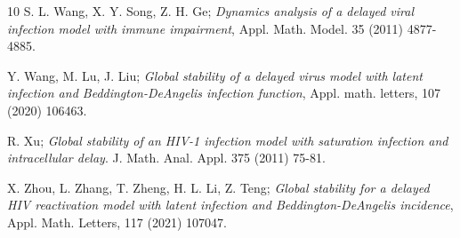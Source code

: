 \documentclass[reqno]{amsart}
\begin{document}
\begin{thebibliography}{10}
 S. L. Wang, X. Y. Song, Z. H. Ge;
\emph{Dynamics analysis of a delayed viral infection model with immune impairment}, 
Appl. Math. Model. 35 (2011) 4877-4885.

 Y. Wang, M. Lu, J. Liu;
\emph{Global stability of a delayed virus model with latent infection and 
Beddington-DeAngelis infection function}, 
Appl. math. letters, 107 (2020) 106463.

 R. Xu;
\emph{Global stability of an HIV-1 infection model with saturation infection and 
intracellular delay}. J. Math. Anal. Appl. 375 (2011)  75-81.

 X. Zhou, L. Zhang, T. Zheng, H. L. Li, Z. Teng;
\emph{Global stability for a delayed HIV reactivation model with latent infection and 
Beddington-DeAngelis incidence},
 Appl. Math. Letters, 117 (2021) 107047.

\end{thebibliography}
\end{document}
